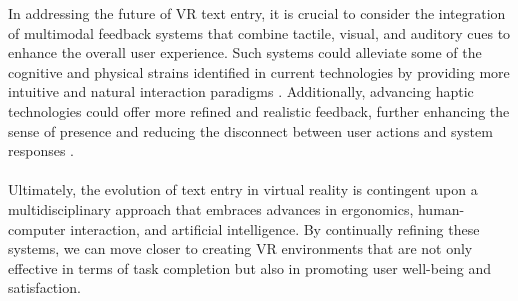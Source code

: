 In addressing the future of \ac{VR} text entry, it is crucial to consider the integration of multimodal feedback systems that combine tactile, visual, and auditory cues to enhance the overall user experience. Such systems could alleviate some of the cognitive and physical strains identified in current technologies by providing more intuitive and natural interaction paradigms \cite{hayward2022xr}. Additionally, advancing haptic technologies could offer more refined and realistic feedback, further enhancing the sense of presence and reducing the disconnect between user actions and system responses \cite{teather2020flik}.\\ \\
Ultimately, the evolution of text entry in virtual reality is contingent upon a multidisciplinary approach that embraces advances in ergonomics, human-computer interaction, and artificial intelligence. By continually refining these systems, we can move closer to creating \ac{VR} environments that are not only effective in terms of task completion but also in promoting user well-being and satisfaction.
